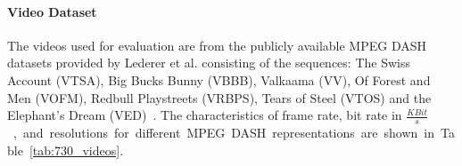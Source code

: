 \paragraph{Video Dataset}
\label{sec:730_video_dataset}
The videos used for evaluation are from the publicly available \ac{MPEG} \ac{DASH} datasets provided by Lederer et al. consisting of the sequences:
The Swiss Account (VTSA), Big Bucks Bunny (VBBB), Valkaama (VV), Of Forest and Men (VOFM), Redbull Playstreets (VRBPS), Tears of Steel (VTOS) and the Elephant's Dream (VED)~\cite{Lederer2013}.
The characteristics of frame rate, bit rate in \unit{$\frac{KBit}{s}$}, and resolutions for different \ac{MPEG} \ac{DASH} representations are shown in Table~\ref{tab:730_videos}.
\begin{table}[!htb]
\caption[Video encoding profiles used in the VAS evaluation]{Video encoding profiles of different videos from the \ac{MPEG} DASH dataset~\cite{Lederer2013} with static frame rates for each video and variable resolutions (S) and bit rates (B) in \unit{$\frac{KBit}{s}$}. R shows the \ac{MPEG} \ac{DASH} representation index.}
\end{table}
